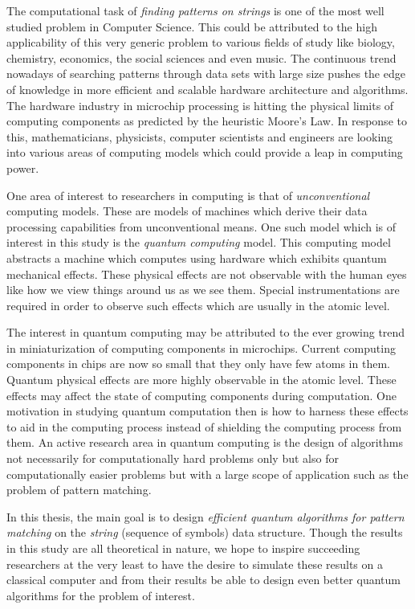 The computational task of \textit{finding patterns on strings} is one of the most well studied problem in Computer Science. This could be attributed to the high applicability of this very generic problem to various fields of study like biology, chemistry, economics, the social sciences and even music. The continuous trend nowadays of searching patterns through data sets with large size pushes the edge of knowledge in more efficient and scalable hardware architecture and algorithms. The hardware industry in microchip processing is hitting the physical limits of computing components as predicted by the heuristic Moore's Law. In response to this, mathematicians, physicists, computer scientists and engineers are looking into various areas of computing models which could provide a leap in computing power.

One area of interest to researchers in computing is that of \textit{unconventional} computing models. These are models of machines which derive their data processing capabilities from unconventional means. One such model which is of interest in this study is the \textit{quantum computing} model. This computing model abstracts a machine which computes using hardware which exhibits quantum mechanical effects. These physical effects are not observable with the human eyes like how we view things around us as we see them. Special instrumentations are required in order to observe such effects which are usually in the atomic level. 

The interest in quantum computing may be attributed to the ever growing trend in miniaturization of computing components in microchips. Current computing components in chips are now so small that they only have few atoms in them. Quantum physical effects are more highly observable in the atomic level. These effects may affect the state of computing components during computation. One motivation in studying quantum computation then is how to harness these effects to aid in the computing process instead of shielding the computing process from them. An active research area in quantum computing is the design of algorithms not necessarily for computationally hard problems only but also for computationally easier problems but with a large scope of application such as the problem of pattern matching.

In this thesis, the main goal is to design \textit{efficient quantum algorithms for pattern matching} on the \textit{string} (sequence of symbols) data structure. Though the results in this study are all theoretical in nature, we hope to inspire succeeding researchers at the very least to have the desire to simulate these results on a classical computer and from their results be able to design even better quantum algorithms for the problem of interest.

